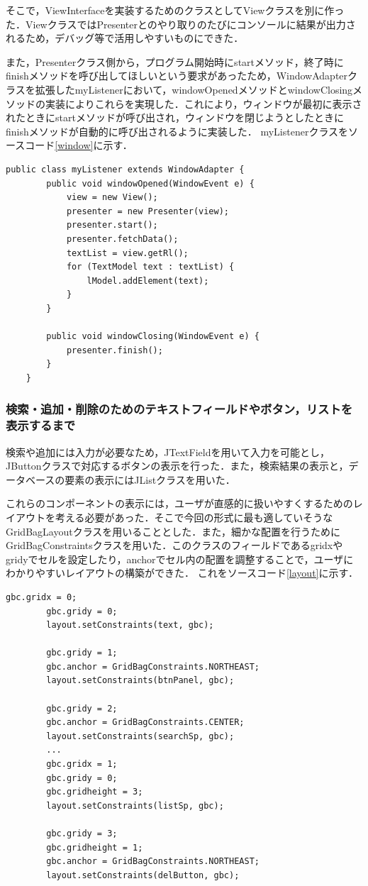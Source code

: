 \documentclass[12pt]{jarticle}
\begin{document}
そこで，ViewInterfaceを実装するためのクラスとしてViewクラスを別に作った．ViewクラスではPresenterとのやり取りのたびにコンソールに結果が出力されるため，デバッグ等で活用しやすいものにできた．

また，Presenterクラス側から，プログラム開始時にstartメソッド，終了時にfinishメソッドを呼び出してほしいという要求があったため，WindowAdapterクラスを拡張したmyListenerにおいて，windowOpenedメソッドとwindowClosingメソッドの実装によりこれらを実現した．これにより，ウィンドウが最初に表示されたときにstartメソッドが呼び出され，ウィンドウを閉じようとしたときにfinishメソッドが自動的に呼び出されるように実装した．
myListenerクラスをソースコード\ref{window}に示す．

\begin{lstlisting}[caption=myListenerクラス, label=window]
    public class myListener extends WindowAdapter {
        public void windowOpened(WindowEvent e) {
            view = new View();
            presenter = new Presenter(view);
            presenter.start();
            presenter.fetchData();
            textList = view.getRl();
            for (TextModel text : textList) {
                lModel.addElement(text);
            }
        }

        public void windowClosing(WindowEvent e) {
            presenter.finish();
        }
    }
\end{lstlisting}

\subsubsection{検索・追加・削除のためのテキストフィールドやボタン，リストを表示するまで}
検索や追加には入力が必要なため，JTextFieldを用いて入力を可能とし，JButtonクラスで対応するボタンの表示を行った．また，検索結果の表示と，データベースの要素の表示にはJListクラスを用いた．

これらのコンポーネントの表示には，ユーザが直感的に扱いやすくするためのレイアウトを考える必要があった．そこで今回の形式に最も適していそうなGridBagLayoutクラスを用いることとした．また，細かな配置を行うためにGridBagConstraintsクラスを用いた．このクラスのフィールドであるgridxやgridyでセルを設定したり，anchorでセル内の配置を調整することで，ユーザにわかりやすいレイアウトの構築ができた．
これをソースコード\ref{layout}に示す．

\begin{lstlisting}[caption=UnifyGUIコンストラクタの一部, label=layout]
        gbc.gridx = 0;
        gbc.gridy = 0;
        layout.setConstraints(text, gbc);

        gbc.gridy = 1;
        gbc.anchor = GridBagConstraints.NORTHEAST;
        layout.setConstraints(btnPanel, gbc);

        gbc.gridy = 2;
        gbc.anchor = GridBagConstraints.CENTER;
        layout.setConstraints(searchSp, gbc);
        ...
        gbc.gridx = 1;
        gbc.gridy = 0;
        gbc.gridheight = 3;
        layout.setConstraints(listSp, gbc);

        gbc.gridy = 3;
        gbc.gridheight = 1;
        gbc.anchor = GridBagConstraints.NORTHEAST;
        layout.setConstraints(delButton, gbc);
\end{lstlisting}
\end{document}
